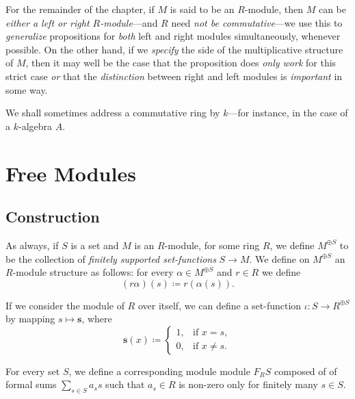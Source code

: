 \begin{remark}
    \label{rem:R-modules-convension}
    For the remainder of the chapter, if \(M\) is said to be an \(R\)-module, then
    \(M\) can be \emph{either a left or right \(R\)-module}---and \(R\) need
    \emph{not be commutative}---we use this to \emph{generalize} propositions for
    \emph{both} left and right modules simultaneously, whenever possible. On the
    other hand, if we \emph{specify} the side of the multiplicative structure of
    \(M\), then it may well be the case that the proposition does \emph{only work}
    for this strict case \emph{or} that the \emph{distinction} between right and left
    modules is \emph{important} in some way.
\end{remark}

\begin{remark}
    \label{rem:algebras-and-commutative-rings}
    We shall sometimes address a commutative ring by \(k\)---for instance, in the case
    of a \(k\)-algebra \(A\).
\end{remark}

\section{Free Modules}

\subsection{Construction}

As always, if \(S\) is a set and \(M\) is an \(R\)-module, for some ring \(R\),
we define \(M^{\oplus S}\) to be the collection of \emph{finitely supported
    set-functions} \(S \to M\). We define on \(M^{\oplus S}\) an \(R\)-module
structure as follows: for every \(\alpha \in M^{\oplus S}\) and \(r \in R\) we
define
\[
    (r \alpha)(s) \coloneq r (\alpha(s)).
\]

If we consider the module of \(R\) over itself, we can define a set-function
\(\iota: S \to R^{\oplus S}\) by mapping \(s \mapsto \mathbf{s}\), where
\[
    \mathbf{s}(x) \coloneq
    \begin{cases}
        1, & \text{if } x = s,    \\
        0, & \text{if } x \neq s.
    \end{cases}
\]

For every set \(S\), we define a corresponding module module \(F_R S\) composed
of of formal sums \(\sum_{s \in S} a_s s\) such that \(a_s \in R\) is non-zero
only for finitely many \(s \in S\).

